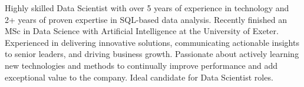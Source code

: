 
\vspace{-1mm}
\color{sectiondivider}\vhrulefill{1.0pt}
\begin{cvparagraph}


Highly skilled Data Scientist with over 5 years of experience in technology and 2+ years of proven expertise in SQL-based data analysis. Recently finished an MSc in Data Science with Artificial Intelligence at the University of Exeter. Experienced in delivering innovative solutions, communicating actionable insights to senior leaders, and driving business growth. Passionate about actively learning new technologies and methods to continually improve performance and add exceptional value to the company. Ideal candidate for Data Scientist roles.
%
\end{cvparagraph}
